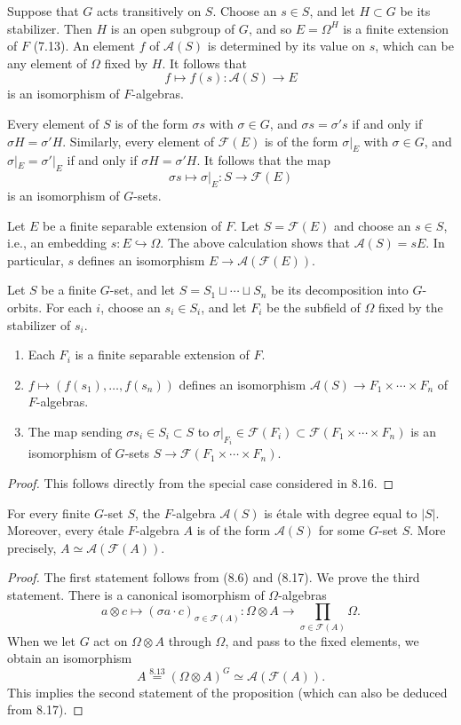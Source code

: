 Suppose that $G$ acts transitively on $S$. Choose an $s\in S$, and let $H\subset G$ be its stabilizer. Then $H$ is an open subgroup of $G$, and so $E=\Omega^H$ is a finite extension of $F$ (7.13). An element $f$ of $\mathcal A(S)$ is determined by its value on $s$, which can be any element of $\Omega$ fixed by $H$. It follows that
\[f\longmapsto f(s):\mathcal A(S)\longrightarrow E\]
is an isomorphism of $F$-algebras.

Every element of $S$ is of the form $\sigma s$ with $\sigma\in G$, and $\sigma s=\sigma's$ if and only if $\sigma H=\sigma'H$. Similarly, every element of $\mathcal F(E)$ is of the form $\sigma|_E$ with $\sigma\in G$, and $\sigma|_E=\sigma'|_E$ if and only if $\sigma H=\sigma'H$. It follows that the map
\[\sigma s\longmapsto\sigma|_E:S\longrightarrow\mathcal F(E)\]
is an isomorphism of $G$-sets.

Let $E$ be a finite separable extension of $F$. Let $S=\mathcal F(E)$ and choose an $s\in S$, i.e., an embedding $s:E\hookrightarrow\Omega$. The above calculation shows that $\mathcal A(S)=sE$. In particular, $s$ defines an isomorphism $E\to\mathcal A(\mathcal F(E))$.

\begin{proposition}[8.17]
Let $S$ be a finite $G$-set, and let $S=S_1\sqcup\cdots\sqcup S_n$ be its decomposition into $G$-orbits. For each $i$, choose an $s_i\in S_i$, and let $F_i$ be the subfield of $\Omega$ fixed by the stabilizer of $s_i$.
\begin{enumerate}[label=(\alph*)]
\item Each $F_i$ is a finite separable extension of $F$.
\item $f\mapsto(f(s_1),\ldots,f(s_n))$ defines an isomorphism $\mathcal A(S)\to F_1\times\cdots\times F_n$ of $F$-algebras.
\item The map sending $\sigma s_i\in S_i\subset S$ to $\sigma|_{F_i}\in\mathcal F(F_i)\subset\mathcal F(F_1\times\cdots\times F_n)$ is an isomorphism of $G$-sets $S\to\mathcal F(F_1\times\cdots\times F_n)$.
\end{enumerate}
\end{proposition}
\begin{proof}
This follows directly from the special case considered in 8.16.
\end{proof}
\begin{proposition}[8.18]
For every finite $G$-set $S$, the $F$-algebra $\mathcal A(S)$ is \'etale with degree equal to $|S|$. Moreover, every \'etale $F$-algebra $A$ is of the form $\mathcal A(S)$ for some $G$-set $S$. More precisely, $A\simeq\mathcal A(\mathcal F(A))$.
\end{proposition}
\begin{proof}
The first statement follows from (8.6) and (8.17). We prove the third statement. There is a canonical isomorphism of $\Omega$-algebras
\[a\otimes c\longmapsto(\sigma a\cdot c)_{\sigma\in\mathcal F(A)}:\Omega\otimes A\longrightarrow\prod_{\sigma\in\mathcal F(A)}\Omega.\]
When we let $G$ act on $\Omega\otimes A$ through $\Omega$, and pass to the fixed elements, we obtain an isomorphism
\[A\overset{8.13}{=}(\Omega\otimes A)^G\simeq\mathcal A(\mathcal F(A)).\]
This implies the second statement of the proposition (which can also be deduced from 8.17).
\end{proof}
